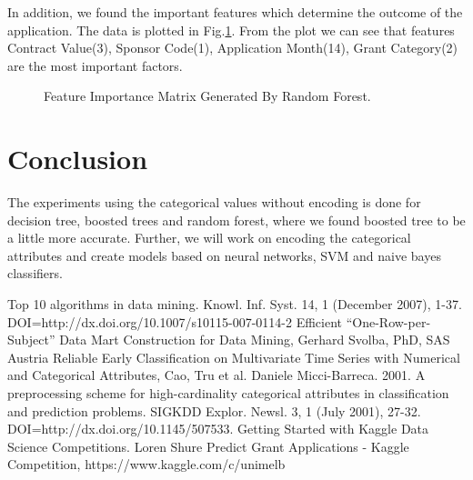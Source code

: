 \documentclass{article} %
\begin{document}
	In addition, we found the important features which determine the outcome of the application. The data is plotted in Fig.\ref{fig:FIM}. From the plot we can see that features Contract Value(3), Sponsor Code(1), Application Month(14), Grant Category(2) are the most important factors.
	
	\begin{figure}[h]
		\begin{center}
		\end{center}
		\caption{Feature Importance Matrix Generated By Random Forest.}
		\label{fig:FIM}
	\end{figure}
	
	
	\section{Conclusion}
	The experiments using the categorical values without encoding is done for decision tree, boosted trees and random forest, where we found boosted tree to be a little more accurate. Further, we will work on encoding the categorical attributes and create models based on neural networks, SVM and naive bayes classifiers.
	
	\begin{thebibliography}{10} %
		 Top 10 algorithms in data mining. Knowl. Inf. Syst. 14, 1 (December 2007), 1-37. DOI=http://dx.doi.org/10.1007/s10115-007-0114-2
		 Efficient “One-Row-per-Subject” Data Mart Construction for Data Mining, Gerhard Svolba, PhD, SAS Austria
		 Reliable Early Classification on Multivariate Time Series with Numerical and Categorical Attributes, Cao, Tru et al.
		Daniele Micci-Barreca. 2001. A preprocessing scheme for high-cardinality categorical attributes in classification and prediction problems. SIGKDD Explor. Newsl. 3, 1 (July 2001), 27-32. DOI=http://dx.doi.org/10.1145/507533.
		 Getting Started with Kaggle Data Science Competitions. Loren Shure
		 Predict Grant Applications - Kaggle Competition, https://www.kaggle.com/c/unimelb 
	\end{thebibliography}
	
\end{document}
